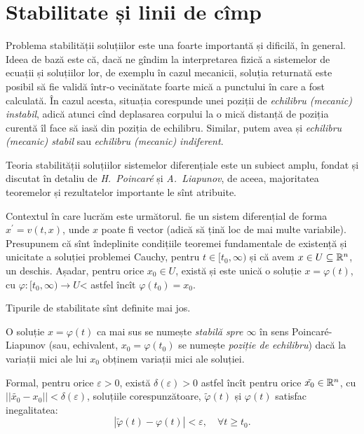 
\chapter{Stabilitate și linii de cîmp}

\indent\indent Problema stabilității soluțiilor este una foarte importantă și dificilă,
în general. Ideea de bază este că, dacă ne gîndim la interpretarea fizică
a sistemelor de ecuații și soluțiilor lor, de exemplu în cazul mecanicii,
soluția returnată este posibil să fie validă într-o vecinătate foarte mică
a punctului în care a fost calculată. În cazul acesta, situația corespunde
unei poziții de \textit{echilibru (mecanic) instabil}, adică atunci cînd
deplasarea corpului la o mică distanță de poziția curentă îl face să iasă
din poziția de echilibru. Similar, putem avea și \textit{echilibru (mecanic) stabil}
sau \textit{echilibru (mecanic) indiferent}.

Teoria stabilității soluțiilor sistemelor diferențiale este un subiect amplu,
fondat și discutat în detaliu de \textit{H.\ Poincar\'e} și \textit{A.\ Liapunov},
de aceea, majoritatea teoremelor și rezultatelor importante le sînt atribuite.

Contextul în care lucrăm este următorul. fie un sistem diferențial de forma
$ x^\prime = v(t, x) $, unde $ x $ poate fi vector (adică să țină loc de mai
multe variabile). Presupunem că sînt îndeplinite condițiile teoremei fundamentale
de existență și unicitate a soluției problemei Cauchy, pentru $ t \in [t_0, \infty) $
și că avem $ x \in U \subseteq \mathbb{R}^n $, un deschis. Așadar, pentru orice $ x_0 \in U $,
există și este unică o soluție $ x = \varphi(t) $, cu $ \varphi : [t_0, \infty) \to U $<
astfel încît $ \varphi(t_0) = x_0 $.

Tipurile de stabilitate sînt definite mai jos.

\begin{definition}\label{def:stabil-inf}
  O soluție $ x = \varphi(t) $ ca mai sus se numește \emph{stabilă spre $\infty$}
  în sens Poincar\'e-Lia\-pu\-nov (sau, echivalent, $ x_0 = \varphi(t_0) $
  se numește \emph{poziție de echilibru}) dacă la variații mici ale
  lui $ x_0 $ ob\-ți\-nem variații mici ale soluției.

  Formal, pentru orice $ \varepsilon > 0 $, există $ \delta(\varepsilon) > 0 $
  astfel încît pentru orice $ \tilde{x_0} \in \mathbb{R}^n $, cu
  $ ||\tilde{x_0} - x_0 || < \delta(\varepsilon) $, soluțiile corespunzătoare,
  $ \tilde{\varphi}(t) $ și $ \varphi(t) $ satisfac inegalitatea:
  \[
    | \tilde{\varphi}(t) - \varphi(t) | < \varepsilon, \quad \forall t \geq t_0.
  \]
\end{definition}

